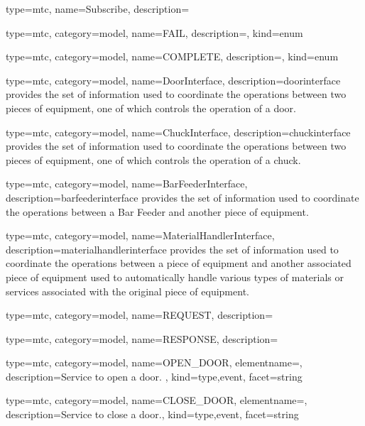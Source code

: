 {
  type=mtc,
  name={Subscribe},
  description={}
}



{
  type=mtc,
  category=model,
  name={FAIL},
  description={},
  kind={enum}
}


{
  type=mtc,
  category=model,
  name={COMPLETE},
  description={},
  kind={enum}
}


{
  type=mtc,
  category=model,
  name={DoorInterface},
  description={\gls{doorinterface} provides the set of information used to coordinate the operations between two pieces of equipment, one of which controls the operation of a door. }
}


{
  type=mtc,
  category=model,
  name={ChuckInterface},
  description={\gls{chuckinterface} provides the set of information used to coordinate the operations between two pieces of equipment, one of which controls the operation of a chuck.  }
}


{
  type=mtc,
  category=model,
  name={BarFeederInterface},
  description={\gls{barfeederinterface} provides the set of information used to coordinate the operations between a Bar Feeder and another piece of equipment.  }
}


{
  type=mtc,
  category=model,
  name={MaterialHandlerInterface},
  description={\gls{materialhandlerinterface} provides the set of information used to coordinate the operations between a piece of equipment and another associated piece of equipment used to automatically handle various types of materials or services associated with the original piece of equipment. }
}


{
  type=mtc,
  category=model,
  name={REQUEST},
  description={}
}


{
  type=mtc,
  category=model,
  name={RESPONSE},
  description={}
}


{
  type=mtc,
  category=model,
  name={OPEN\_DOOR},
  elementname=,
  description={Service to open a door. },
  kind={type,event},
  facet={\gls{string}}
}


{
  type=mtc,
  category=model,
  name={CLOSE\_DOOR},
  elementname=,
  description={Service to close a door.},
  kind={type,event},
  facet={\gls{string}}
}


